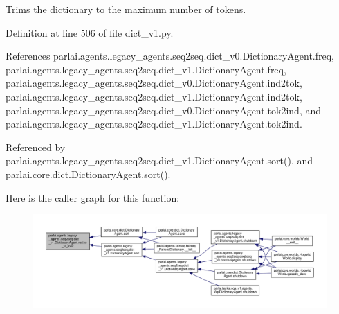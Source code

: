 \begin{DoxyVerb}Trims the dictionary to the maximum number of tokens.\end{DoxyVerb}
 

Definition at line 506 of file dict\+\_\+v1.\+py.



References parlai.\+agents.\+legacy\+\_\+agents.\+seq2seq.\+dict\+\_\+v0.\+Dictionary\+Agent.\+freq, parlai.\+agents.\+legacy\+\_\+agents.\+seq2seq.\+dict\+\_\+v1.\+Dictionary\+Agent.\+freq, parlai.\+agents.\+legacy\+\_\+agents.\+seq2seq.\+dict\+\_\+v0.\+Dictionary\+Agent.\+ind2tok, parlai.\+agents.\+legacy\+\_\+agents.\+seq2seq.\+dict\+\_\+v1.\+Dictionary\+Agent.\+ind2tok, parlai.\+agents.\+legacy\+\_\+agents.\+seq2seq.\+dict\+\_\+v0.\+Dictionary\+Agent.\+tok2ind, and parlai.\+agents.\+legacy\+\_\+agents.\+seq2seq.\+dict\+\_\+v1.\+Dictionary\+Agent.\+tok2ind.



Referenced by parlai.\+agents.\+legacy\+\_\+agents.\+seq2seq.\+dict\+\_\+v1.\+Dictionary\+Agent.\+sort(), and parlai.\+core.\+dict.\+Dictionary\+Agent.\+sort().

Here is the caller graph for this function\+:
\nopagebreak
\begin{figure}[H]
\begin{center}
\leavevmode
\includegraphics[width=350pt]{classparlai_1_1agents_1_1legacy__agents_1_1seq2seq_1_1dict__v1_1_1DictionaryAgent_a11701fcf8e4fb57e78fa6a2f4cc29800_icgraph}
\end{center}
\end{figure}
\mbox{\label{classparlai_1_1agents_1_1legacy__agents_1_1seq2seq_1_1dict__v1_1_1DictionaryAgent_aacac3c53a7aef02a731d427fcb8bdf87}} 
